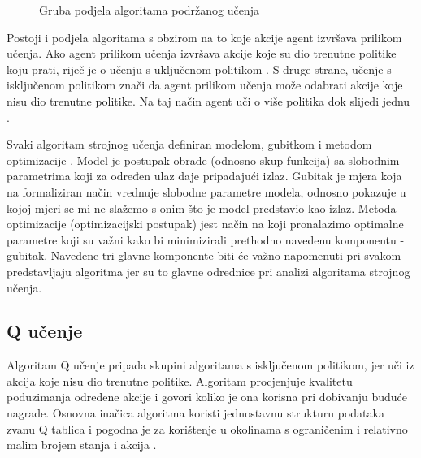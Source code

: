 \begin{figure}[H]
    \centering
    \caption{Gruba podjela algoritama podržanog učenja \cite{RLAlgos}}
    \label{fig:rl-algorithms}
\end{figure}

Postoji i podjela algoritama s obzirom na to koje akcije agent izvršava prilikom učenja. Ako agent prilikom učenja izvršava akcije koje su dio trenutne politike koju prati, riječ je o učenju s uključenom politikom . S druge strane, učenje s isključenom politikom  znači da agent prilikom učenja može odabrati akcije koje nisu dio trenutne politike. Na taj način agent uči o više politika dok slijedi jednu \cite{PodUceFer}.

Svaki algoritam strojnog učenja definiran modelom, gubitkom i metodom optimizacije \cite{StruceFer}. Model je postupak obrade (odnosno skup funkcija) sa slobodnim parametrima koji za određen ulaz daje pripadajući izlaz. Gubitak je mjera koja na formaliziran način vrednuje slobodne parametre modela, odnosno pokazuje u kojoj mjeri se mi ne slažemo s onim što je model predstavio kao izlaz. Metoda optimizacije (optimizacijski postupak) jest način na koji pronalazimo optimalne parametre koji su važni kako bi minimizirali prethodno navedenu komponentu - gubitak. Navedene tri glavne komponente biti će važno napomenuti pri svakom predstavljaju algoritma jer su to glavne odrednice pri analizi algoritama strojnog učenja.

\subsection{Q učenje}

Algoritam Q učenje  pripada skupini algoritama s isključenom politikom, jer uči iz akcija koje nisu dio trenutne politike. Algoritam procjenjuje kvalitetu  poduzimanja određene akcije i govori koliko je ona korisna pri dobivanju buduće nagrade. Osnovna inačica algoritma koristi jednostavnu strukturu podataka zvanu Q tablica  i pogodna je za korištenje u okolinama s ograničenim i relativno malim brojem stanja i akcija \cite{QL}. 

